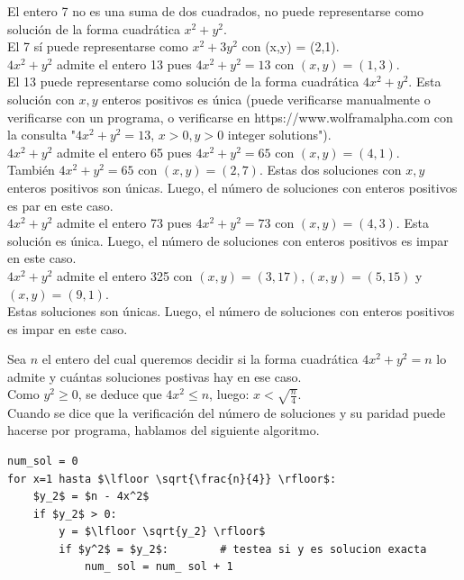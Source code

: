 \begin{ejemplo}
El entero 7 no es una suma de dos cuadrados, no puede representarse como
solución de la forma cuadrática $x^{2} + y^{2}$. \\
El 7 sí puede representarse como $x^{2} + 3y^2$ con
(x,y) = (2,1). \\
$4x^2 + y^{2}$ admite el entero 13 pues $4x^2 + y^2 = 13$
con $(x,y) = (1,3)$. \\
El 13 puede representarse como solución de la forma cuadrática
$4x^2 + y^2$. Esta solución con $x,y$ enteros positivos es
única (puede verificarse manualmente o verificarse con un programa, o verificarse en https://www.wolframalpha.com con la consulta "$4x^2 + y^2 = 13$, $x > 0, y > 0$ integer solutions"). \\
$4x^2 + y^2$ admite el entero 65 pues $4x^2 + y^2 = 65$ con $(x,y) = (4,1)$. \\
También $4x^2 + y^2 = 65$ con $(x,y) = (2,7)$. Estas dos
soluciones con $x,y$ enteros positivos son únicas. Luego, el número de soluciones con enteros positivos es par en este caso. \\
$4x^2 + y^2$ admite el entero 73 pues $4x^2 + y^2 = 73$ con $(x,y) = (4,3)$. Esta solución es única. Luego, el número de
soluciones con enteros positivos es impar en este caso. \\
$4x^2 + y^2$ admite el entero 325 con $(x,y) = (3,17),
(x,y) = (5,15)$ y $(x,y) = (9,1)$.\\
Estas soluciones son únicas. Luego, el número de soluciones con enteros positivos es impar en este caso.
\end{ejemplo}

Sea $n$ el entero del cual queremos decidir si la forma cuadrática $4x^2 + y^2 = n$ lo admite y cuántas soluciones postivas hay en ese caso. \\
Como $y^2 \geq 0$, se deduce que $4x^2 \le n$, luego: $x < \sqrt{\frac{n}{4}}$. \\ 

Cuando se dice que la verificación del número de soluciones y su paridad puede hacerse por programa, hablamos del siguiente algoritmo.

\begin{lstlisting}[caption={Verificación del número de soluciones enteras positivas}, label={alg:AlgVerifica}, mathescape=true]
num_sol = 0
for x=1 hasta $\lfloor \sqrt{\frac{n}{4}} \rfloor$:
    $y_2$ = $n - 4x^2$ 
    if $y_2$ > 0:
        y = $\lfloor \sqrt{y_2} \rfloor$
        if $y^2$ = $y_2$:        # testea si y es solucion exacta
            num_ sol = num_ sol + 1
\end{lstlisting}

